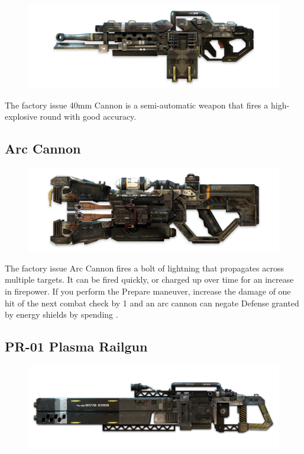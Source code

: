 \documentclass[9pt, openany]{extbook}
\begin{document}
\begin{figure}
\vspace*{-2em}
\includegraphics[width=\linewidth]{40mmCannon}
\end{figure}

The factory issue 40mm Cannon is a semi-automatic weapon that fires a high-explosive round with good accuracy. 

\subsection{Arc Cannon}
\begin{figure}
\vspace*{-2em}
\includegraphics[width=\linewidth]{ArcCannon}
\end{figure}

The factory issue Arc Cannon fires a bolt of lightning that propagates across multiple targets. It can be fired quickly, or charged up over time for an increase in firepower. If you perform the Prepare maneuver, increase the damage of one hit of the next combat check by 1 and an arc cannon can negate Defense granted by energy shields by spending \Advantage\Advantage.

\subsection{PR-01 Plasma Railgun}
\begin{figure}
\vspace*{-2em}
\includegraphics[width=\linewidth]{PlasmaRailgun}
\end{figure}
\end{document}
